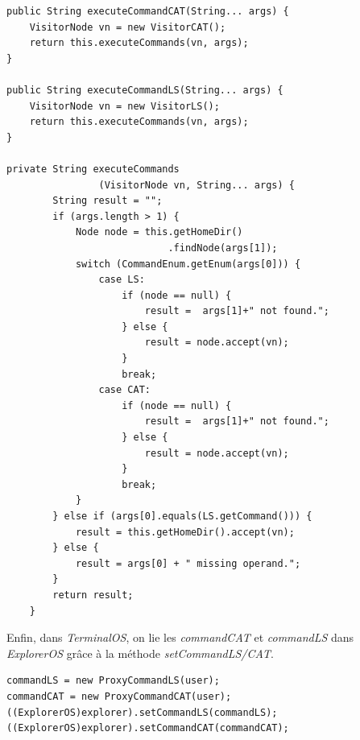 \begin{lstlisting}
public String executeCommandCAT(String... args) {
    VisitorNode vn = new VisitorCAT();
    return this.executeCommands(vn, args);
}

public String executeCommandLS(String... args) {
    VisitorNode vn = new VisitorLS();
    return this.executeCommands(vn, args);
}

private String executeCommands
				(VisitorNode vn, String... args) {
        String result = "";
        if (args.length > 1) {
            Node node = this.getHomeDir()
            				.findNode(args[1]);
            switch (CommandEnum.getEnum(args[0])) {
                case LS:
                    if (node == null) {
                        result =  args[1]+" not found.";
                    } else {
                        result = node.accept(vn);
                    }
                    break;
                case CAT:
                    if (node == null) {
                        result =  args[1]+" not found.";
                    } else {
                        result = node.accept(vn);
                    }
                    break;
            }
        } else if (args[0].equals(LS.getCommand())) {
            result = this.getHomeDir().accept(vn);
        } else {
            result = args[0] + " missing operand.";
        }
        return result;
    }
\end{lstlisting}

Enfin,  dans \emph{TerminalOS}, on lie les \emph{commandCAT} et \emph{commandLS} dans \emph{ExplorerOS}  grâce à la méthode \emph{setCommandLS/CAT}.

\begin{lstlisting}
commandLS = new ProxyCommandLS(user);
commandCAT = new ProxyCommandCAT(user);
((ExplorerOS)explorer).setCommandLS(commandLS);
((ExplorerOS)explorer).setCommandCAT(commandCAT);
\end{lstlisting}


